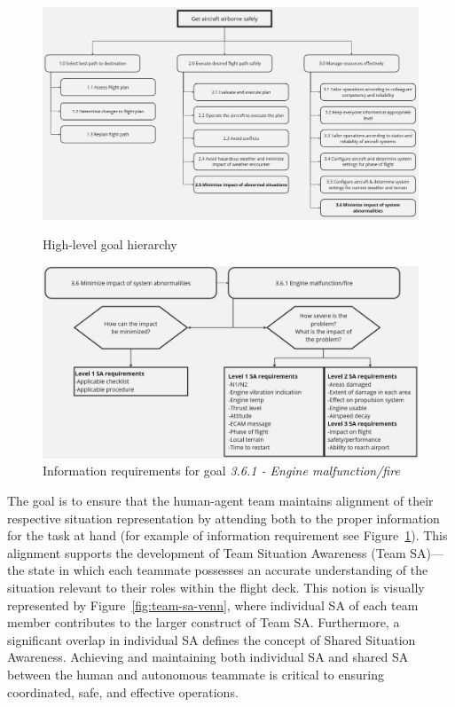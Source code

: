 \documentclass[12pt,a4paper]{article} %
\begin{document}
	\begin{figure}[H]
		\centering
		\begin{minipage}[b]{1\textwidth}
			\centering
			\includegraphics[width=1\textwidth]{./images/gdta_goal_hierarchy.jpg}
			\caption{High-level goal hierarchy}
			\label{fig:goal-hierarchy}
		\end{minipage}
		\begin{minipage}[b]{1\textwidth}
			\centering
			\includegraphics[width=1\textwidth]{images/goal_and_info_req.jpg}
			\caption{Information requirements for goal \textit{3.6.1 - Engine malfunction/fire}}
			\label{fig:info_req}
		\end{minipage}
	\end{figure}

	The goal is to ensure that the human-agent team maintains alignment of their respective situation representation by attending both to the proper information for the task at hand (for example of information requirement see Figure~\ref{fig:info_req}). This alignment supports the development of Team Situation Awareness (Team SA)—the state in which each teammate possesses an accurate understanding of the situation relevant to their roles within the flight deck.
	This notion is visually represented by Figure~\ref{fig:team-sa-venn}, where individual SA of each team member contributes to the larger construct of Team SA. Furthermore, a significant overlap in individual SA defines the concept of Shared Situation Awareness. Achieving and maintaining both individual SA and shared SA between the human and autonomous teammate is critical to ensuring coordinated, safe, and effective operations.
\end{document}
